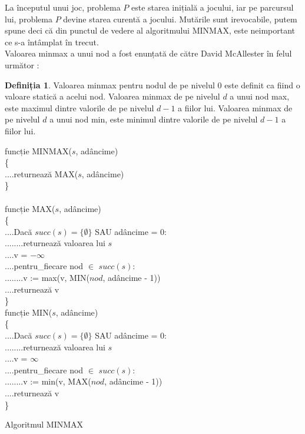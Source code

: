 \documentclass[12pt,twoside,a4paper,fleqn]{book}
\theoremstyle{definition}
\newtheorem{definitie}{Definiția}
\begin{document}
La începutul unui joc, problema $P$ este starea inițială a jocului, iar pe parcursul lui, problema $P$ devine starea curentă a jocului. Mutările sunt irevocabile, putem spune deci că din punctul de vedere al algoritmului MINMAX, este neimportant ce s-a întâmplat în trecut.\\
Valoarea minmax a unui nod a fost enunțată de către David McAllester în felul următor \cite{mcAllester}:
\begin{definitie}
Valoarea minmax pentru nodul de pe nivelul $0$ este definit ca fiind o valoare statică a acelui nod. Valoarea minmax de pe nivelul $d$ a unui nod max, este maximul dintre valorile de pe nivelul $d-1$ a fiilor lui. Valoarea minmax de pe nivelul $d$ a unui nod min, este minimul dintre valorile de pe nivelul $d-1$ a fiilor lui.
\end{definitie}

\begin{pseudocod}
funcție MINMAX($s$, adâncime)\\
\{\\
....returnează MAX($s$, adâncime)\\
\}\\
\\
funcție MAX($s$, adâncime)\\
\{\\
....Dacă $succ(s) = \{\emptyset\}$ SAU adâncime = $0$:\\
........returnează valoarea lui $s$\\

....v = $-\infty$\\
....pentru\_fiecare nod $\in$ $succ(s)$:\\
........v := max(v, MIN($nod$, adâncime - 1))\\
....returnează v\\
\}\\

funcție MIN($s$, adâncime)\\
\{\\
....Dacă $succ(s) = \{\emptyset\}$ SAU adâncime = $0$:\\
........returnează valoarea lui $s$\\

....v = $\infty$\\
....pentru\_fiecare nod $\in$ $succ(s)$:\\
........v := min(v, MAX($nod$, adâncime - 1))\\
....returnează v\\
\}


\caption{Algoritmul MINMAX}
\end{pseudocod}
\end{document}
